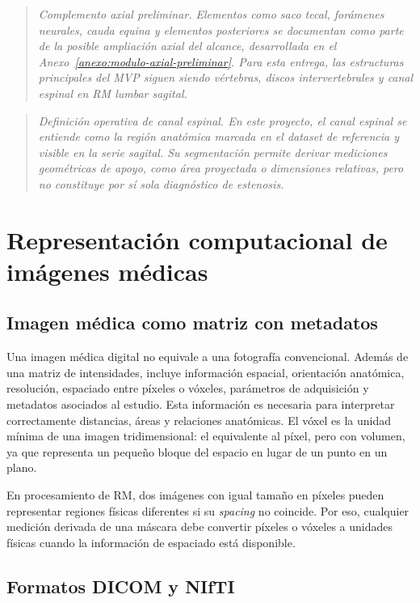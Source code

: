 \begin{quote}
\itshape
Complemento axial preliminar. Elementos como saco tecal, forámenes neurales, cauda equina y elementos posteriores se documentan como parte de la posible ampliación axial del alcance, desarrollada en el Anexo~\ref{anexo:modulo-axial-preliminar}. Para esta entrega, las estructuras principales del MVP siguen siendo vértebras, discos intervertebrales y canal espinal en RM lumbar sagital.
\end{quote}

\begin{quote}
\itshape
Definición operativa de canal espinal. En este proyecto, el canal espinal se entiende como la región anatómica marcada en el dataset de referencia y visible en la serie sagital. Su segmentación permite derivar mediciones geométricas de apoyo, como área proyectada o dimensiones relativas, pero no constituye por sí sola diagnóstico de estenosis.
\end{quote}

\section{Representación computacional de imágenes médicas}

\subsection{Imagen médica como matriz con metadatos}

Una imagen médica digital no equivale a una fotografía convencional. Además de una matriz de intensidades, incluye información espacial, orientación anatómica, resolución, espaciado entre píxeles o vóxeles, parámetros de adquisición y metadatos asociados al estudio. Esta información es necesaria para interpretar correctamente distancias, áreas y relaciones anatómicas. El vóxel es la unidad mínima de una imagen tridimensional: el equivalente al píxel, pero con volumen, ya que representa un pequeño bloque del espacio en lugar de un punto en un plano.

En procesamiento de RM, dos imágenes con igual tamaño en píxeles pueden representar regiones físicas diferentes si su \textit{spacing} no coincide. Por eso, cualquier medición derivada de una máscara debe convertir píxeles o vóxeles a unidades físicas cuando la información de espaciado está disponible.

\subsection{Formatos DICOM y NIfTI}

